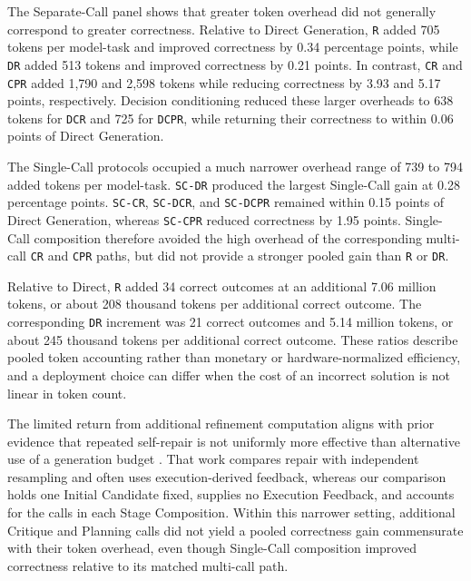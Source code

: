 The Separate-Call panel shows that greater token overhead did not generally correspond to greater correctness.
Relative to Direct Generation, \texttt{R} added 705 tokens per model-task and improved correctness by 0.34 percentage points, while \texttt{DR} added 513 tokens and improved correctness by 0.21 points.
In contrast, \texttt{CR} and \texttt{CPR} added 1,790 and 2,598 tokens while reducing correctness by 3.93 and 5.17 points, respectively.
Decision conditioning reduced these larger overheads to 638 tokens for \texttt{DCR} and 725 for \texttt{DCPR}, while returning their correctness to within 0.06 points of Direct Generation.

The Single-Call protocols occupied a much narrower overhead range of 739 to 794 added tokens per model-task.
\texttt{SC-DR} produced the largest Single-Call gain at 0.28 percentage points.
\texttt{SC-CR}, \texttt{SC-DCR}, and \texttt{SC-DCPR} remained within 0.15 points of Direct Generation, whereas \texttt{SC-CPR} reduced correctness by 1.95 points.
Single-Call composition therefore avoided the high overhead of the corresponding multi-call \texttt{CR} and \texttt{CPR} paths, but did not provide a stronger pooled gain than \texttt{R} or \texttt{DR}.

Relative to Direct, \texttt{R} added 34 correct outcomes at an additional 7.06 million tokens, or about 208 thousand tokens per additional correct outcome.
The corresponding \texttt{DR} increment was 21 correct outcomes and 5.14 million tokens, or about 245 thousand tokens per additional correct outcome.
These ratios describe pooled token accounting rather than monetary or hardware-normalized efficiency, and a deployment choice can differ when the cost of an incorrect solution is not linear in token count.

The limited return from additional refinement computation aligns with prior evidence that repeated self-repair is not uniformly more effective than alternative use of a generation budget \cite{olausson2024selfrepair}.
That work compares repair with independent resampling and often uses execution-derived feedback, whereas our comparison holds one Initial Candidate fixed, supplies no Execution Feedback, and accounts for the calls in each Stage Composition.
Within this narrower setting, additional Critique and Planning calls did not yield a pooled correctness gain commensurate with their token overhead, even though Single-Call composition improved correctness relative to its matched multi-call path.
